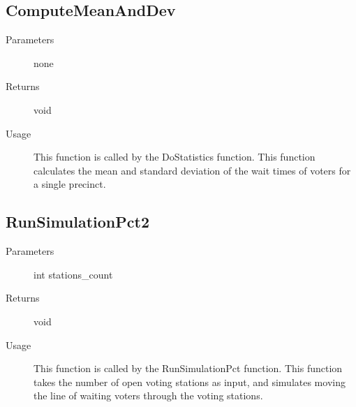 \subsection{ComputeMeanAndDev}
\begin{description}
\item[Parameters] none
\item[Returns] void
\item[Usage] This function is called by the DoStatistics function.  This function calculates the mean and standard deviation of the wait times of voters for a single precinct.
\end{description}

\subsection{RunSimulationPct2}
\begin{description}
\item[Parameters] int stations\_count
\item[Returns] void
\item[Usage] This function is called by the RunSimulationPct function.  This function takes the number of open voting stations as input, and simulates moving the line of waiting voters through the voting stations.
\end{description}

\fi %
